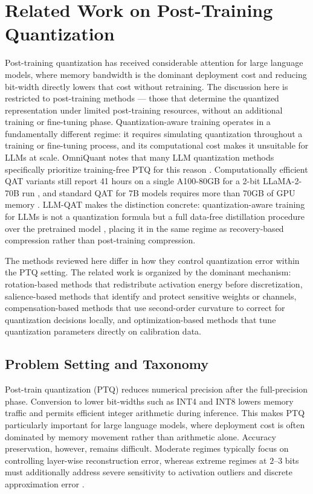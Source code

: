 
\section{Related Work on Post-Training Quantization}

Post-training quantization has received considerable attention for large language models, where memory bandwidth is the dominant deployment cost and reducing bit-width directly lowers that cost without retraining. The discussion here is restricted to post-training methods — those that determine the quantized representation under limited post-training resources, without an additional training or fine-tuning phase. Quantization-aware training operates in a fundamentally different regime: it requires simulating quantization throughout a training or fine-tuning process, and its computational cost makes it unsuitable for LLMs at scale. OmniQuant notes that many LLM quantization methods specifically prioritize training-free PTQ for this reason \cite{shao2023omniquant}. Computationally efficient QAT variants still report 41 hours on a single A100-80GB for a 2-bit LLaMA-2-70B run \cite{tang2024efficientqat}, and standard QAT for 7B models requires more than 70GB of GPU memory \cite{bondarenko2024lrqat}. LLM-QAT makes the distinction concrete: quantization-aware training for LLMs is not a quantization formula but a full data-free distillation procedure over the pretrained model \cite{liu2023llm}, placing it in the same regime as recovery-based compression rather than post-training compression.

The methods reviewed here differ in how they control quantization error within the PTQ setting. The related work is organized by the dominant mechanism: rotation-based methods that redistribute activation energy before discretization, salience-based methods that identify and protect sensitive weights or channels, compensation-based methods that use second-order curvature to correct for quantization decisions locally, and optimization-based methods that tune quantization parameters directly on calibration data.

\subsection{Problem Setting and Taxonomy}

Post-train quantization (PTQ) reduces numerical precision after the full-precision phase. Conversion to lower bit-widths such as INT4 and INT8 lowers memory traffic and permits efficient integer arithmetic during inference. This makes PTQ particularly important for large language models, where deployment cost is often dominated by memory movement rather than arithmetic alone. Accuracy preservation, however, remains difficult. Moderate regimes typically focus on controlling layer-wise reconstruction error, whereas extreme regimes at $2$--$3$ bits must additionally address severe sensitivity to activation outliers and discrete approximation error \cite{frantar2022gptq,chee2024quip,ashkboos2024quarot}.

